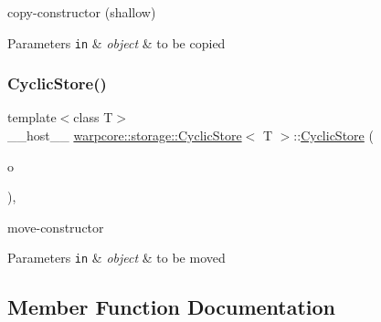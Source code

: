 copy-\/constructor (shallow) 


\begin{DoxyParams}[1]{Parameters}
\mbox{\tt in}  & {\em object} & to be copied \\
\hline
\end{DoxyParams}
\mbox{\label{classwarpcore_1_1storage_1_1CyclicStore_a5657f1b2e0f9f7c8ee0de28d2c305cf0}} 
\subsubsection{\texorpdfstring{Cyclic\+Store()}{CyclicStore()}\hspace{0.1cm}{\footnotesize\ttfamily [3/3]}}
{\footnotesize\ttfamily template$<$class T$>$ \\
\+\_\+\+\_\+host\+\_\+\+\_\+ \hyperlink{classwarpcore_1_1storage_1_1CyclicStore}{warpcore\+::storage\+::\+Cyclic\+Store}$<$ T $>$\+::\hyperlink{classwarpcore_1_1storage_1_1CyclicStore}{Cyclic\+Store} (\begin{DoxyParamCaption}\item[{\hyperlink{classwarpcore_1_1storage_1_1CyclicStore}{Cyclic\+Store}$<$ T $>$ \&\&}]{o }\end{DoxyParamCaption})\hspace{0.3cm}{\ttfamily [inline]}, {\ttfamily [noexcept]}}



move-\/constructor 


\begin{DoxyParams}[1]{Parameters}
\mbox{\tt in}  & {\em object} & to be moved \\
\hline
\end{DoxyParams}


\subsection{Member Function Documentation}
\mbox{\label{classwarpcore_1_1storage_1_1CyclicStore_acc4bfbb9b10868a193301d0ec5a46711}} 
